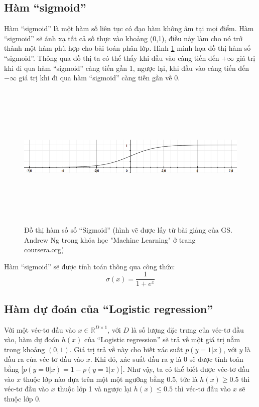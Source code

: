 \subsection{Hàm ``sigmoid''}
Hàm ``sigmoid'' là một hàm số liên tục có đạo hàm không âm tại mọi điểm. Hàm ``sigmoid'' sẽ ánh xạ tất cả số thực vào khoảng (0,1), điều này làm cho nó trở thành một hàm phù hợp cho bài toán phân lớp. Hình \ref{fig:2.2_sigmoid} minh họa đồ thị hàm số ``sigmoid''. Thông qua đồ thị ta có thể thấy khi đầu vào càng tiến đến $+\infty$ giá trị khi đi qua hàm ``sigmoid'' càng tiến gần 1, ngược lại, khi đầu vào càng tiến đến $-\infty$ giá trị khi đi qua hàm ``sigmoid'' càng tiến gần về 0.
\begin{figure}[h]
    \centering
    \includegraphics[width=\textwidth, height=7cm]{images/Chapter2/sigmoid.png}
    \caption{Đồ thị hàm số số ``Sigmoid'' (hình vẽ được lấy từ bài giảng của GS. Andrew Ng trong khóa học "Machine Learning" ở trang \href{https://www.coursera.org/learn/machine-learning}{coursera.org})}
    \label{fig:2.2_sigmoid}
\end{figure}

Hàm ``sigmoid'' sẽ được tính toán thông qua công thức:
\begin{equation}
    \sigma(x) = \frac{1}{1+ e^{x}}
    \label{eq:2.2_sigmoid}
\end{equation}

\subsection{Hàm dự đoán của ``Logistic regression''}
Với một véc-tơ đầu vào $x \in \mathbb{R}^{D\times 1}$, với $D$ là số lượng đặc trưng của véc-tơ đầu vào, hàm dự đoán $h(x)$ của ``Logistic regression'' sẽ trả về một giá trị nằm trong khoảng $(0,1)$. Giá trị trả về này cho biết xác suất $p(y=1|x)$, với $y$ là đầu ra của véc-tơ đầu vào $x$. Khi đó, xác suất đầu ra $y$ là 0 sẽ được tính toán bằng [$p(y=0|x) = 1 - p(y=1|x)$]. Như vậy, ta có thể biết được véc-tơ đầu vào $x$ thuộc lớp nào dựa trên một một ngưỡng bằng 0.5, tức là $h(x) \geq 0.5$ thì véc-tơ đầu vào $x$ thuộc lớp 1 và ngược lại $h(x) \leq 0.5$ thì véc-tơ đầu vào $x$ sẽ thuộc lớp 0.

